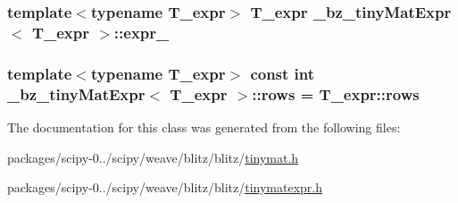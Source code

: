 \subsubsection[{expr\+\_\+}]{\setlength{\rightskip}{0pt plus 5cm}template$<$typename T\+\_\+expr$>$ T\+\_\+expr {\bf \+\_\+bz\+\_\+tiny\+Mat\+Expr}$<$ T\+\_\+expr $>$\+::expr\+\_\+\hspace{0.3cm}{\ttfamily [protected]}}\label{class__bz__tinyMatExpr_ad805b4a71b573c802f465b4cc7f2697e}
\hypertarget{class__bz__tinyMatExpr_aad6620184c1ba01b93ba16bec5d1b00a}{}
\subsubsection[{rows}]{\setlength{\rightskip}{0pt plus 5cm}template$<$typename T\+\_\+expr$>$ const int {\bf \+\_\+bz\+\_\+tiny\+Mat\+Expr}$<$ T\+\_\+expr $>$\+::rows = T\+\_\+expr\+::rows\hspace{0.3cm}{\ttfamily [static]}}\label{class__bz__tinyMatExpr_aad6620184c1ba01b93ba16bec5d1b00a}


The documentation for this class was generated from the following files\+:\begin{DoxyCompactItemize}
\item 
packages/scipy-\/0../scipy/weave/blitz/blitz/\hyperlink{tinymat_8h}{tinymat.\+h}\item 
packages/scipy-\/0../scipy/weave/blitz/blitz/\hyperlink{tinymatexpr_8h}{tinymatexpr.\+h}\end{DoxyCompactItemize}
